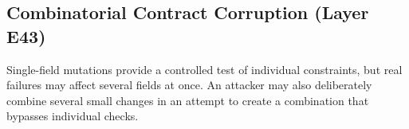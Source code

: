 \documentclass[a4paper,fleqn]{cas-dc}
\begin{document}
\begin{table}[pos=t]
\centering
\small
\caption{B5 vs.\ B6 mutation coverage per operator class (Layer E28). \checkmark\ = rejects all cases in class. \texttimes\ = fails to reject (false-certifies).}
\label{tab:mutation_coverage}
\end{table}


\subsection{Combinatorial Contract Corruption (Layer E43)}

Single-field mutations provide a controlled test of individual constraints, but real failures may affect several fields at once. An attacker may also deliberately combine several small changes in an attempt to create a combination that bypasses individual checks.
\end{document}
